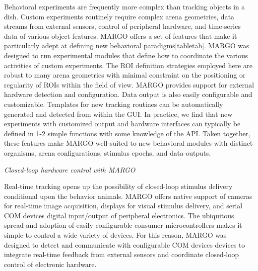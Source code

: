 \documentclass[10pt]{article}
\begin{document}
\begin{multicols}{2}
Behavioral experiments are frequently more complex than tracking objects in a dish. Custom experiments routinely require complex arena geometries, data streams from external sensors, control of peripheral hardware, and time-series data of various object features. MARGO offers a set of features that make it particularly adept at defining new behavioral paradigms[tabletab]. MARGO was designed to run experimental modules that define how to coordinate the various activities of custom experiments. The ROI definition strategies employed here are robust to many arena geometries with minimal constraint on the positioning or regularity of ROIs within the field of view. MARGO provides support for external hardware detection and configuration. Data output is also easily configurable and customizable. Templates for new tracking routines can be automatically generated and detected from within the GUI. In practice, we find that new experiments with customized output and hardware interfaces can typically be defined in 1-2 simple functions with some knowledge of the API. Taken together, these features make MARGO well-suited to new behavioral modules with distinct organisms, arena configurations, stimulus epochs, and data outputs.


\textit{Closed-loop hardware control with MARGO}

Real-time tracking opens up the possibility of closed-loop stimulus delivery conditional upon the behavior animals. MARGO offers native support of cameras for real-time image acquisition, displays for visual stimulus delivery, and serial COM devices digital input/output of peripheral electronics. The ubiquitous spread and adoption of easily-configurable consumer microcontrollers makes it simple to control a wide variety of devices. For this reason, MARGO was designed to detect and communicate with configurable COM devices devices to integrate real-time feedback from external sensors and coordinate closed-loop control of electronic hardware.


\end{multicols}
\end{document}
